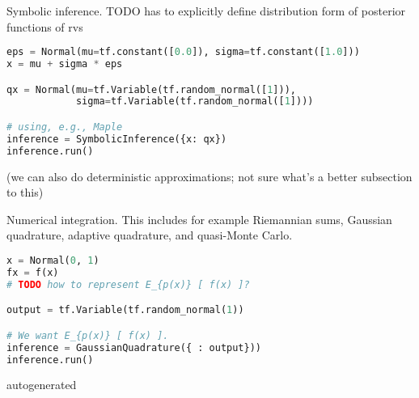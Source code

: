 Symbolic inference.
TODO has to explicitly define distribution form of posterior
functions of rvs
\begin{lstlisting}[language=Python]
eps = Normal(mu=tf.constant([0.0]), sigma=tf.constant([1.0]))
x = mu + sigma * eps

qx = Normal(mu=tf.Variable(tf.random_normal([1])),
            sigma=tf.Variable(tf.random_normal([1])))

# using, e.g., Maple
inference = SymbolicInference({x: qx})
inference.run()
\end{lstlisting}

(we can also do deterministic approximations; not sure what's a better subsection to this)

Numerical integration. This includes for example Riemannian sums, Gaussian quadrature,
adaptive quadrature, and quasi-Monte Carlo.
\begin{lstlisting}[language=Python]
x = Normal(0, 1)
fx = f(x)
# TODO how to represent E_{p(x)} [ f(x) ]?

output = tf.Variable(tf.random_normal(1))

# We want E_{p(x)} [ f(x) ].
inference = GaussianQuadrature({ : output}))
inference.run()
\end{lstlisting}

{{autogenerated}}
